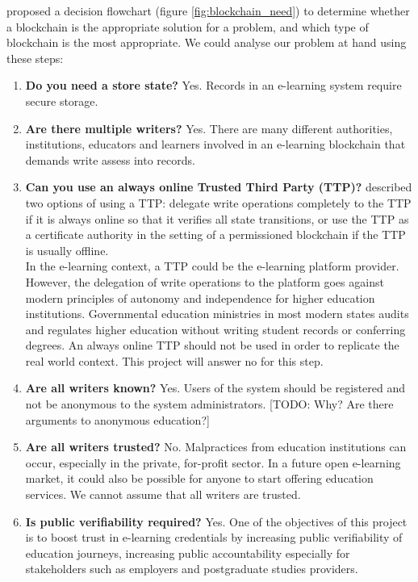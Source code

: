 \citet[p.3]{wust2017you} proposed a decision flowchart (figure \ref{fig:blockchain_need}) to determine whether a blockchain is 
the appropriate solution for a problem, and which type of blockchain is the most appropriate. We could analyse our problem at 
hand using these steps:

\begin{enumerate}
    \item \textbf{Do you need a store state?} Yes. Records in an e-learning system require secure storage.
    \item \textbf{Are there multiple writers?} Yes. There are many different authorities, institutions, educators and learners 
    involved in an e-learning blockchain that demands write assess into records.
    \item \textbf{Can you use an always online Trusted Third Party (TTP)?} \citet[p.2]{wust2017you} described two options of 
    using a TTP: delegate write operations completely to the TTP if it is always online so that it verifies all state 
    transitions, or use the TTP as a certificate authority in the setting of a permissioned blockchain if the TTP is usually 
    offline.\\ 
    In the e-learning context, a TTP could be the e-learning platform provider. However, the delegation of write operations 
    to the platform goes against modern principles of autonomy and independence for higher education institutions. 
    Governmental education ministries in most modern states audits and regulates higher education without writing student 
    records or conferring degrees. An always online TTP should not be used in order to replicate the real world context. This 
    project will answer no for this step.
    \item \textbf{Are all writers known?} Yes. Users of the system should be registered and not be anonymous to the system 
    administrators. [TODO: Why? Are there arguments to anonymous education?]
    \item \textbf{Are all writers trusted?} No. Malpractices from education institutions can occur, especially in the private, 
    for-profit sector. In a future open e-learning market, it could also be possible for anyone to start offering education 
    services. We cannot assume that all writers are trusted.
    \item \textbf{Is public verifiability required?} Yes. One of the objectives of this project is to boost trust in e-learning 
    credentials by increasing public verifiability of education journeys, increasing public accountability especially for 
    stakeholders such as employers and postgraduate studies providers.
\end{enumerate}

